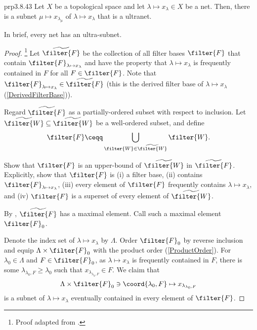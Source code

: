 \begin{prp}{}{prp3.8.43}
Let $X$ be a topological space and let $\lambda \mapsto x_{\lambda}\in X$ be a net.  Then, there is a subnet $\mu \mapsto x_{\lambda _{\mu}}$ of $\lambda \mapsto x_{\lambda}$ that is a ultranet.
\begin{rmk}
In brief, every net has an ultra-subnet.
\end{rmk}
\begin{proof}\footnote{Proof adapted from \cite[pg.~90]{Howes}.}
Let $\widetilde{\filter{F}}$ be the collection of all filter bases $\filter{F}$ that contain $\filter{F}_{\lambda \mapsto x_{\lambda}}$ and have the property that $\lambda \mapsto x_{\lambda}$ is frequently contained in $F$ for all $F\in \filter{F}$.  Note that $\filter{F}_{\lambda \mapsto x_{\lambda}}\in \widetilde{\filter{F}}$ (this is the derived filter base of $\lambda \mapsto x_{\lambda}$ (\cref{DerivedFilterBase})).

Regard $\widetilde{\filter{F}}$ as a partially-ordered subset with respect to inclusion.  Let $\widetilde{\filter{W}}\subseteq \widetilde{\filter{W}}$ be a well-ordered subset, and define
\begin{equation}
\filter{F}\ceqq \bigcup _{\filter{W}\in \widetilde{\filter{W}}}\filter{W}.
\end{equation}
\begin{exr}[breakable=false]{}{}
Show that $\filter{F}$ is an upper-bound of $\widetilde{\filter{W}}$ in $\widetilde{\filter{F}}$.  Explicitly, show that $\filter{F}$ is (i) a filter base, (ii) contains $\filter{F}_{\lambda \mapsto x_{\lambda}}$, (iii) every element of $\filter{F}$ frequently contains $\lambda \mapsto x_{\lambda}$, and (iv) $\filter{F}$ is a superset of every element of $\widetilde{\filter{W}}$.
\end{exr}
By , $\widetilde{\filter{F}}$ has a maximal element.  Call such a maximal element $\filter{F}_0$.

Denote the index set of $\lambda \mapsto x_{\lambda}$ by $\Lambda$.  Order $\filter{F}_0$ by reverse inclusion and equip $\Lambda \times \filter{F}_0$ with the product order (\cref{ProductOrder}).  For $\lambda _0\in \Lambda$ and $F\in \filter{F}_0$, as $\lambda \mapsto x_{\lambda}$ is frequently contained in $F$, there is some $\lambda _{\lambda _0,F}\geq \lambda _0$ such that $x_{\lambda _{\lambda _0,F}}\in F$.  We claim that
\begin{equation}
\Lambda \times \filter{F}_0\ni \coord{\lambda _0,F}\mapsto x_{\lambda _{\lambda _0,F}}
\end{equation}
is a subnet of $\lambda \mapsto x_{\lambda}$ eventually contained in every element of $\filter{F}$.


\end{proof}
\end{prp}
